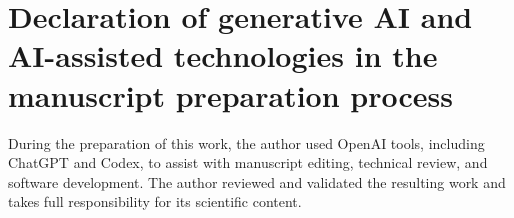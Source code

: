 \section*{Declaration of generative AI and AI-assisted technologies in the manuscript preparation process}

During the preparation of this work, the author used OpenAI tools, including ChatGPT and Codex, to
assist with manuscript editing, technical review, and software development. The author reviewed and
validated the resulting work and takes full responsibility for its scientific content.

